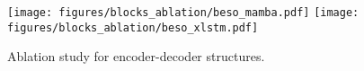 \begin{figure}[t!]
        \centering
            \begin{minipage}[t!]{0.48\textwidth}
                \centering 
                \texttt{[image: figures/blocks\_ablation/beso\_mamba.pdf]}
                \texttt{[image: figures/blocks\_ablation/beso\_xlstm.pdf]}
            \end{minipage}
        \caption[ ]
        {Ablation study for encoder-decoder structures.}
        \label{fig:blocks_ablation}
\end{figure}
